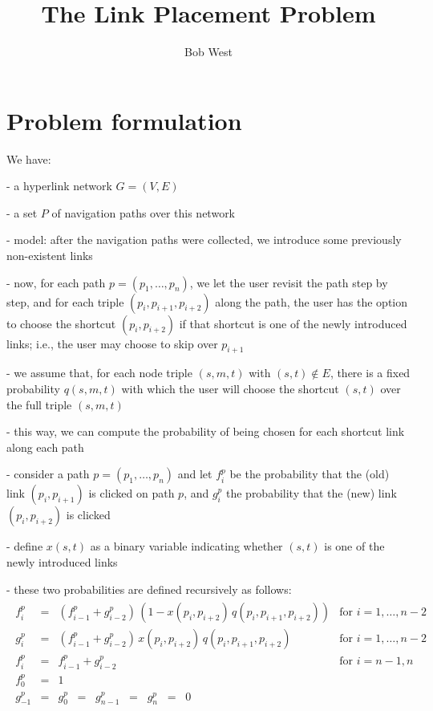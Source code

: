 \documentclass[12pt,letterpaper]{article}
\begin{document}
\title{The Link Placement Problem}
\author{Bob West}
\maketitle

\section{Problem formulation}

We have:

- a hyperlink network $G=(V,E)$

- a set $P$ of navigation paths over this network

- model: after the navigation paths were collected, we introduce some previously non-existent links

- now, for each path $p=(p_1,\dots,p_n)$, we let the user revisit the path step by step, and for each triple $(p_i,p_{i+1},p_{i+2})$ along the path, the user has the option to choose the shortcut $(p_i,p_{i+2})$ if that shortcut is one of the newly introduced links; i.e., the user may choose to skip over $p_{i+1}$

- we assume that, for each node triple $(s,m,t)$ with $(s,t) \notin E$, there is a fixed probability $q(s,m,t)$ with which the user will choose the shortcut $(s,t)$ over the full triple $(s,m,t)$

- this way, we can compute the probability of being chosen for each shortcut link along each path

- consider a path $p=(p_1,\dots,p_n)$ and let $f^p_i$ be the probability that the (old) link $(p_i,p_{i+1})$ is clicked on path $p$, and $g^p_i$ the probability that the (new) link $(p_i,p_{i+2})$ is clicked

- define $x(s,t)$ as a binary variable indicating whether $(s,t)$ is one of the newly introduced links

- these two probabilities are defined recursively as follows:
\begin{eqnarray}
\begin{array}{llll}
f^p_i &=& \left(f^p_{i-1} + g^p_{i-2}\right) \, (1 - x(p_i,p_{i+2}) \, q(p_i,p_{i+1},p_{i+2})) & \mbox{for $i=1,\dots,n-2$} \\
g^p_i &=& \left(f^p_{i-1} + g^p_{i-2}\right) \, x(p_i,p_{i+2}) \, q(p_i,p_{i+1},p_{i+2}) & \mbox{for $i=1,\dots,n-2$} \\
f^p_{i} &=& f^p_{i-1} + g^p_{i-2} & \mbox{for $i=n-1,n$} \\
f^p_0 &=& 1 & \\
g^p_{-1} &=& g^p_0 \;\;=\;\; g^p_{n-1} \;\;=\;\; g^p_n \;\;=\;\; 0 &
\end{array}
\end{eqnarray}
\end{document}
